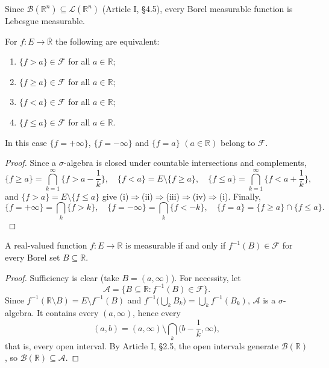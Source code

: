 \documentclass[11pt]{article}
\makeatletter
\newcommand{\envlabel}[1]{\protected@edef\@currentlabel{\themathenv}\label{#1}}
\makeatother
\begin{document}
Since $\mathcal{B}(\mathbb{R}^{n})\subseteq\mathcal{L}(\mathbb{R}^{n})$ (Article I, \S4.5), every Borel measurable function is Lebesgue measurable.

\begin{proposition}\envlabel{en:prop:equiv}
For $f:E\to\overline{\mathbb{R}}$ the following are equivalent:
\begin{enumerate}
  \item $\{f>a\}\in\mathcal{F}$ for all $a\in\mathbb{R}$;
  \item $\{f\geq a\}\in\mathcal{F}$ for all $a\in\mathbb{R}$;
  \item $\{f<a\}\in\mathcal{F}$ for all $a\in\mathbb{R}$;
  \item $\{f\leq a\}\in\mathcal{F}$ for all $a\in\mathbb{R}$.
\end{enumerate}
In this case $\{f=+\infty\}$, $\{f=-\infty\}$ and $\{f=a\}$ $(a\in\mathbb{R})$ belong to $\mathcal{F}$.
\end{proposition}

\begin{proof}
Since a $\sigma$-algebra is closed under countable intersections and complements,
\[
\{f\geq a\}=\bigcap_{k=1}^{\infty}\Big\{f>a-\frac1k\Big\},\quad
\{f<a\}=E\setminus\{f\geq a\},\quad
\{f\leq a\}=\bigcap_{k=1}^{\infty}\Big\{f<a+\frac1k\Big\},
\]
and $\{f>a\}=E\setminus\{f\leq a\}$ give (i)$\Rightarrow$(ii)$\Rightarrow$(iii)$\Rightarrow$(iv)$\Rightarrow$(i). Finally,
\[
\{f=+\infty\}=\bigcap_{k}\{f>k\},\quad \{f=-\infty\}=\bigcap_{k}\{f<-k\},\quad \{f=a\}=\{f\geq a\}\cap\{f\leq a\}.
\]
\end{proof}

\begin{proposition}\envlabel{en:prop:borel}
A real-valued function $f:E\to\mathbb{R}$ is measurable if and only if $f^{-1}(B)\in\mathcal{F}$ for every Borel set $B\subseteq\mathbb{R}$.
\end{proposition}

\begin{proof}
Sufficiency is clear (take $B=(a,\infty)$). For necessity, let
\[
\mathcal{A}=\{B\subseteq\mathbb{R}:f^{-1}(B)\in\mathcal{F}\}.
\]
Since $f^{-1}(\mathbb{R}\setminus B)=E\setminus f^{-1}(B)$ and $f^{-1}\big(\bigcup_{k}B_{k}\big)=\bigcup_{k}f^{-1}(B_{k})$, $\mathcal{A}$ is a $\sigma$-algebra. It contains every $(a,\infty)$, hence every
\[
(a,b)=(a,\infty)\setminus\bigcap_{k}\Big(b-\frac1k,\infty\Big),
\]
that is, every open interval. By Article I, \S2.5, the open intervals generate $\mathcal{B}(\mathbb{R})$, so $\mathcal{B}(\mathbb{R})\subseteq\mathcal{A}$.
\end{proof}
\end{document}
